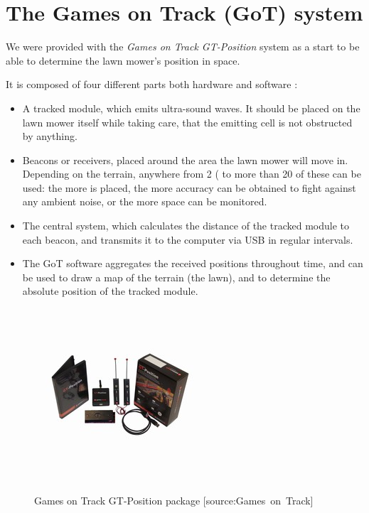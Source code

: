 \nopagebreak

\section{The Games on Track (GoT) system}
We were provided with the \emph{Games on Track GT-Position} system as a start to be able to determine the lawn mower's position in space. 

\noindent
It is composed of four different parts both hardware and software \cite{GOTWebsitePos} :
\begin{itemize}
	\item A tracked module, which emits ultra-sound waves. It should be placed on the lawn mower itself while taking care, that the emitting cell is not obstructed by anything.
	\item Beacons or receivers, placed around the area the lawn mower will move in. Depending on the terrain, anywhere from 2 ( to more than 20 of these can be used: the more is placed, the more accuracy can be obtained to fight against any ambient noise, or the more space can be monitored.
	\item The central system, which calculates the distance of the tracked module to each beacon, and transmits it to the computer via USB in regular intervals.
	\item The GoT software aggregates the received positions throughout time, and can be used to draw a map of the terrain (the lawn), and to determine the absolute position of the tracked module.
\end{itemize}

\begin{figure}[H]
\centering
\includegraphics[scale=1.1]{figures/gotSystem.jpg} 
\label{fig:gotsystem}
\caption{Games on Track GT-Position package [source:Games\ on\ Track]} 
\end{figure}
\noindent

